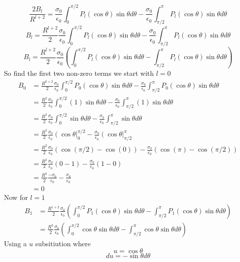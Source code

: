 \documentclass[11pt]{article}
\numberwithin{equation}{section}
\begin{document}
\begin{enumerate}[(i)]
$$\frac{2B_l}{R^{l+2}}= \frac{\sigma_0}{\epsilon_0}\int_0^{\pi/2} P_{l}(\cos\theta)\sin\theta d\theta - \frac{\sigma_0}{\epsilon_0}\int_{\pi/2}^{\pi} P_{l}(\cos\theta)\sin\theta d\theta$$
$$B_l= \frac{R^{l+2}}{2}\frac{\sigma_0}{\epsilon_0}\int_0^{\pi/2} P_{l}(\cos\theta)\sin\theta d\theta - \frac{\sigma_0}{\epsilon_0}\int_{\pi/2}^{\pi} P_{l}(\cos\theta)\sin\theta d\theta$$
$$B_l= \frac{R^{l+2}}{2}\frac{\sigma_0}{\epsilon_0}\left(\int_0^{\pi/2} P_{l}(\cos\theta)\sin\theta d\theta - \int_{\pi/2}^{\pi} P_{l}(\cos\theta)\sin\theta d\theta\right)$$
So find the first two non-zero terms we start with $l=0$
\begin{align*}
B_0 &= \frac{R^{0+2}}{2}\frac{\sigma_0}{\epsilon_0}\int_0^{\pi/2} P_{0}(\cos\theta)\sin\theta d\theta - \frac{\sigma_0}{\epsilon_0}\int_{\pi/2}^{\pi} P_{0}(\cos\theta)\sin\theta d\theta\\
&= \frac{R^{2}}{2}\frac{\sigma_0}{\epsilon_0}\int_0^{\pi/2} (1)\sin\theta d\theta - \frac{\sigma_0}{\epsilon_0}\int_{\pi/2}^{\pi} (1)\sin\theta d\theta\\
&= \frac{R^{2}}{2}\frac{\sigma_0}{\epsilon_0}\int_0^{\pi/2} \sin\theta d\theta - \frac{\sigma_0}{\epsilon_0}\int_{\pi/2}^{\pi} \sin\theta d\theta\\
&= \frac{R^{2}}{2}\frac{\sigma_0}{\epsilon_0}\left(\cos\theta\right|_0^{\pi/2} - \frac{\sigma_0}{\epsilon_0}\left(\cos\theta \right|_{\pi/2}^{\pi}\\
&= \frac{R^{2}}{2}\frac{\sigma_0}{\epsilon_0}\left(\cos(\pi/2)-\cos(0)\right) - \frac{\sigma_0}{\epsilon_0}\left(\cos(\pi)-\cos(\pi/2)\right)\\
&= \frac{R^{2}}{2}\frac{\sigma_0}{\epsilon_0}\left(0-1\right) - \frac{\sigma_0}{\epsilon_0}\left(1-0\right)\\
&= \frac{R^{2}}{2}\frac{-\sigma_0}{\epsilon_0}- \frac{\sigma_0}{\epsilon_0}\\
&=0
\end{align*}
Now for $l=1$
\begin{align*}
B_1 &= \frac{R^{1+2}}{2}\frac{\sigma_0}{\epsilon_0}\left(\int_0^{\pi/2} P_{1}(\cos\theta)\sin\theta d\theta - \int_{\pi/2}^{\pi} P_{1}(\cos\theta)\sin\theta d\theta\right)\\
&= \frac{R^{3}}{2}\frac{\sigma_0}{\epsilon_0}\left(\int_0^{\pi/2}\cos\theta\sin\theta d\theta - \int_{\pi/2}^{\pi} \cos\theta\sin\theta d\theta\right)
\end{align*}
Using a $u$ subsitiution where
$$u=\cos\theta$$
$$du=-\sin\theta d\theta$$
\end{enumerate}
\end{document}
